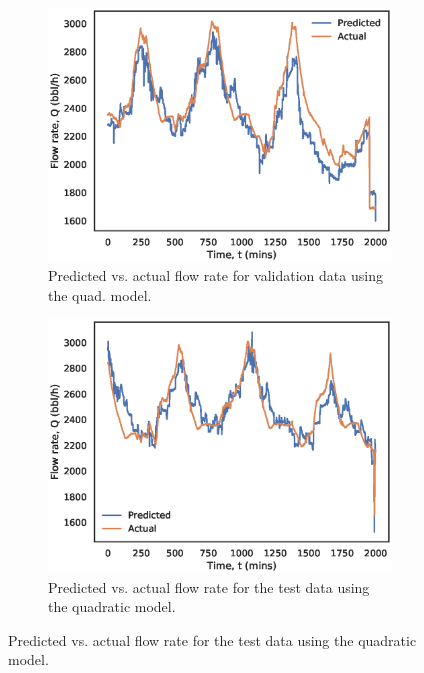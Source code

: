 \begin{figure}[h]
     \centering
     \begin{subfigure}[b]{0.45\textwidth}
         \centering
         \includegraphics[width=\textwidth]{images/suncor/08quad_validation.eps}
         \caption{Predicted vs. actual flow rate for validation data using the quad. model.}
         \label{fig:02quad_validation}
     \end{subfigure}
     \begin{subfigure}[b]{0.45\textwidth}
         \centering
         \includegraphics[width=\textwidth]{images/suncor/08quad_test.eps}
         \caption{Predicted vs. actual flow rate for the test data using the quadratic model.}
         \label{fig:02quad_test}
     \end{subfigure}

\end{figure}
